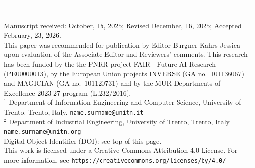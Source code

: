 \documentclass[11pt]{article}
\begin{document}
\vspace{1em}

\noindent\rule{0.4\textwidth}{0.4pt}\\[4pt]
{\footnotesize
Manuscript received: October, 15, 2025; Revised December, 16, 2025;
Accepted February, 23, 2026.\\[2pt]
This paper was recommended for publication by Editor Burgner-Kahrs
Jessica upon evaluation of the Associate Editor and Reviewers'
comments. This research has been funded by the the PNRR project
FAIR - Future AI Research (PE00000013), by the European Union
projects INVERSE (GA no.~101136067) and MAGICIAN (GA no.~101120731)
and by the MUR Departments of Excellence 2023-27 program
(L.232/2016).\\[2pt]
$^{1}$ Department of Information Engineering and Computer Science,
University of Trento, Trento, Italy. \texttt{name.surname@unitn.it}\\[2pt]
$^{2}$ Department of Industrial Engineering, University of Trento,
Trento, Italy. \texttt{name.surname@unitn.org}\\[2pt]
Digital Object Identifier (DOI): see top of this page.\\[6pt]
This work is licensed under a Creative Commons Attribution 4.0
License. For more information, see
\texttt{https://creativecommons.org/licenses/by/4.0/}
}
\end{document}
